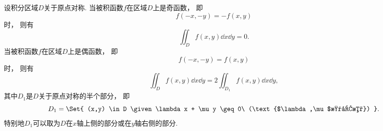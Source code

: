 设积分区域\(D\)关于原点对称.
当被积函数\(f\)在区域\(D\)上是奇函数，
即\begin{equation*}
	f(-x,-y) = -f(x,y)
\end{equation*}时，
则有\begin{equation*}
	\iint_D f(x,y) \dd{x}\dd{y} = 0.
\end{equation*}
当被积函数\(f\)在区域\(D\)上是偶函数，
即\begin{equation*}
	f(-x,-y) = f(x,y)
\end{equation*}时，
则有\begin{equation*}
	\iint_D f(x,y) \dd{x}\dd{y} = 2 \iint_{D_1} f(x,y) \dd{x}\dd{y},
\end{equation*}
其中\(D_1\)是\(D\)关于原点对称的半个部分，
即\begin{equation*}
	D_1 = \Set{ (x,y) \in D \given \lambda x + \mu y \geq 0\ (\text{$\lambda,\mu$是参数}) }.
\end{equation*}
特别地\(D_1\)可以取为\(D\)在\(x\)轴上侧的部分或在\(y\)轴右侧的部分.

